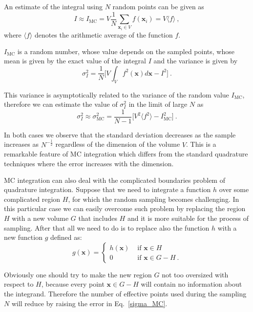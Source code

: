 \documentclass[../main/main.tex]{subfiles}
\begin{document}
An estimate of the integral using $N$ random points can be given as
\begin{equation}
	I \approx I_{\text{MC}} = V \frac{1}{N} \sum_{\textbf{x}_i \in V} f(\textbf{x}_i) = V \langle f \rangle \ ,
\end{equation}
where $\langle f \rangle$ denotes the arithmetic average of the function $f$.

$I_{\text{MC}}$ is a random number, whose value depends on the sampled points, whose mean 
is given by the exact value of the integral $I$ and the variance is given by
\begin{equation}
	\label{variance}
	\sigma^2_I = \frac{1}{N} \big[ V \int_{V}   f^2(\textbf{x}) d \textbf{x}  - I^2 \big] \ .
\end{equation}

This variance is asymptotically related to the variance of the random value $I_{\text{MC}}$, therefore
we can estimate the value of $\sigma^2_I$ in the limit of large $N$ as
\begin{equation}
	\label{sigma_MC}
	\sigma^2_I \approx \sigma^2_\text{MC}  = \frac{1}{N-1} \Big[ 
	V^2 \langle  f^2 \rangle 
	- I^2_{\text{MC}}\Big] \ .
\end{equation}

In both cases we observe that the standard deviation decreases as the sample increases 
as $N^{-\frac{1}{2}}$ regardless of the dimension of the volume $V$. This is a remarkable feature of MC integration which differs from the standard quadrature techniques where the error 
increases with the dimension.

MC integration can also deal with the complicated boundaries problem of quadrature integration.
Suppose that we need to integrate a function $h$ over some complicated region $H$, for which the 
random sampling becomes challenging. 
In this particular case we can easily overcome such problem by replacing the region $H$ with a new volume 
$G$ that includes $H$ and it is more suitable for the process of sampling. After that all we need to do is to replace also 
the function $h$ with a new function $g$ defined as:
\begin{equation}
	g(\textbf{x}) = \begin{cases}
		h(\textbf{x}) &\text{ if $\textbf{x} \in H$} \\
		0 &\text{ if $\textbf{x} \in G - H$} \ .
	\end{cases}
\end{equation}

Obviously one should try to make the new region $G$ not too oversized with respect to $H$, because every 
point $\textbf{x} \in G - H$ will contain no information about the integrand. Therefore the number of 
effective points used during the sampling $N$ will reduce by raising the error in Eq.~\eqref{sigma_MC}.
\end{document}

